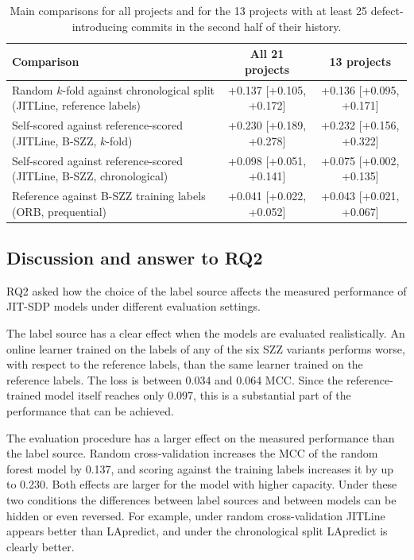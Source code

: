 \documentclass[12pt,a4paper,oneside]{report}
\begin{document}
\begin{table}[htbp]
\centering\small
\caption{Main comparisons for all projects and for the 13 projects with at
least 25 defect-introducing commits in the second half of their history.}
\label{tab:floor}
\begin{tabularx}{\linewidth}{@{}>{\raggedright\arraybackslash}Xcc@{}}
\toprule
Comparison & All 21 projects & 13 projects \\
\midrule
Random $k$-fold against chronological split (JITLine, reference labels) &
+0.137 [+0.105, +0.172] & +0.136 [+0.095, +0.171] \\
Self-scored against reference-scored (JITLine, B-SZZ, $k$-fold) &
+0.230 [+0.189, +0.278] & +0.232 [+0.156, +0.322] \\
Self-scored against reference-scored (JITLine, B-SZZ, chronological) &
+0.098 [+0.051, +0.141] & +0.075 [+0.002, +0.135] \\
Reference against B-SZZ training labels (ORB, prequential) &
+0.041 [+0.022, +0.052] & +0.043 [+0.021, +0.067] \\
\bottomrule
\end{tabularx}
\end{table}

\subsection{Discussion and answer to RQ2}

RQ2 asked how the choice of the label source affects the measured
performance of JIT-SDP models under different evaluation settings.

The label source has a clear effect when the models are evaluated
realistically. An online learner trained on the labels of any of the six SZZ
variants performs worse, with respect to the reference labels, than the same
learner trained on the reference labels. The loss is between 0.034 and 0.064
MCC. Since the reference-trained model itself reaches only 0.097, this is a
substantial part of the performance that can be achieved.

The evaluation procedure has a larger effect on the measured performance
than the label source. Random cross-validation increases the MCC of the
random forest model by 0.137, and scoring against the training labels
increases it by up to 0.230. Both effects are larger for the model with
higher capacity. Under these two conditions the differences between label
sources and between models can be hidden or even reversed. For example,
under random cross-validation JITLine appears better than LApredict, and
under the chronological split LApredict is clearly better.
\end{document}
